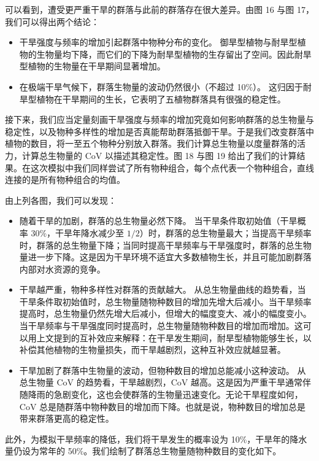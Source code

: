 \documentclass[11pt,a4paper]{ctexart}
\begin{document}
可以看到，遭受更严重干旱的群落与此前的群落存在很大差异。由图 16 与图 17，我们可以得出两个结论：

\begin{itemize}
\item 干旱强度与频率的增加引起群落中物种分布的变化。
御旱型植物与耐旱型植物的生物量均下降，而它们的下降为耐旱型植物的生存留出了空间。因此耐旱型植物的生物量在干旱期间显著增加。
\item 在极端干旱气候下，群落生物量的波动仍然很小（不超过 10\%）。
这归因于耐旱型植物在干旱期间的生长，它表明了五植物群落具有很强的稳定性。
\end{itemize}

接下来，我们应当定量刻画干旱强度与频率的增加究竟如何影响群落的总生物量与稳定性，以及物种多样性的增加是否真能帮助群落抵御干旱。于是我们改变群落中植物的数目，将一至五个物种分别放入群落。我们计算总生物量以度量群落的活力，计算总生物量的 CoV 以描述其稳定性。图 18 与图 19 给出了我们的计算结果。在这次模拟中我们同样尝试了所有物种组合，每个点代表一个物种组合，直线连接的是所有物种组合的均值。

由上列各图，我们可以发现：

\begin{itemize}
\item 随着干旱的加剧，群落的总生物量必然下降。
当干旱条件取初始值（干旱概率 30\%，干旱年降水减少至 $1/2$）时，群落的总生物量最大；当提高干旱频率时，群落的总生物量下降；当同时提高干旱频率与干旱强度时，群落的总生物量进一步下降。这是因为干旱环境不适宜大多数植物生长，并且可能加剧群落内部对水资源的竞争。
\item 干旱越严重，物种多样性对群落的贡献越大。
从总生物量曲线的趋势看，当干旱条件取初始值时，总生物量随物种数目的增加先增大后减小。当干旱频率提高时，总生物量仍然先增大后减小，但增大的幅度变大、减小的幅度变小。当干旱频率与干旱强度同时提高时，总生物量随物种数目的增加而增加。这可以用上文提到的互补效应来解释：在干旱发生期间，耐旱型植物能够生长，以补偿其他植物的生物量损失，而干旱越剧烈，这种互补效应就越显著。
\item 干旱加剧了群落中生物量的波动，但物种数目的增加总能减小这种波动。
从总生物量 CoV 的趋势看，干旱越剧烈，CoV 越高。这是因为严重干旱通常伴随降雨的急剧变化，这也会使群落的生物量迅速变化。无论干旱程度如何，CoV 总是随群落中物种数目的增加而下降。也就是说，物种数目的增加总是带来群落更高的稳定性。
\end{itemize}

此外，为模拟干旱频率的降低，我们将干旱发生的概率设为 10\%，干旱年的降水量仍设为常年的 50\%。我们绘制了群落总生物量随物种数目的变化如下。
\end{document}
